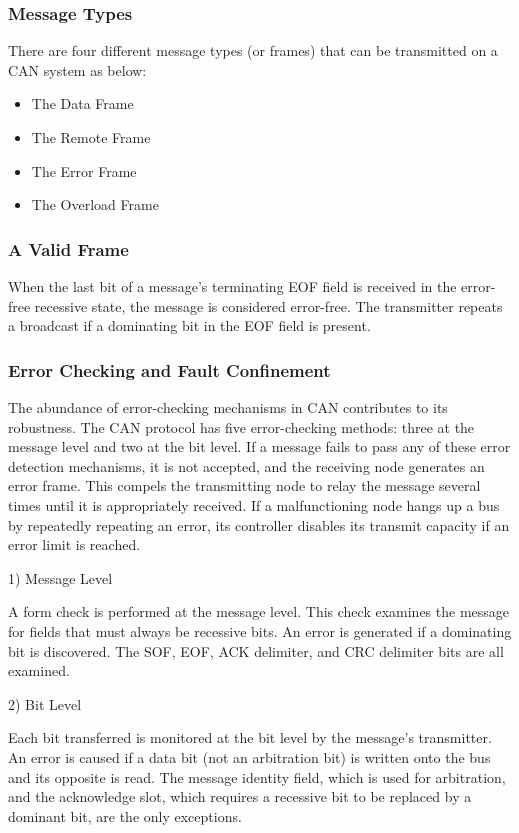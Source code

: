 \subsubsection{Message Types}
There are four different message types (or frames) that can be transmitted on a CAN system as below:

\begin{itemize}
\item The Data Frame
\item The Remote Frame
\item The Error Frame
\item The Overload Frame
\end{itemize}

\subsubsection{A Valid Frame}

When the last bit of a message's terminating EOF field is received in the error-free recessive state, the message is considered error-free. The transmitter repeats a broadcast if a dominating bit in the EOF field is present.

\subsubsection{Error Checking and Fault Confinement}

The abundance of error-checking mechanisms in CAN contributes to its robustness. The CAN protocol has five error-checking methods: three at the message level and two at the bit level. If a message fails to pass any of these error detection mechanisms, it is not accepted, and the receiving node generates an error frame. This compels the transmitting node to relay the message several times until it is appropriately received. If a malfunctioning node hangs up a bus by repeatedly repeating an error, its controller disables its transmit capacity if an error limit is reached.


1) Message Level


A form check is performed at the message level. This check examines the message for fields that must always be recessive bits. An error is generated if a dominating bit is discovered. The SOF, EOF, ACK delimiter, and CRC delimiter bits are all examined.

2) Bit Level


Each bit transferred is monitored at the bit level by the message's transmitter. An error is caused if a data bit (not an arbitration bit) is written onto the bus and its opposite is read. The message identity field, which is used for arbitration, and the acknowledge slot, which requires a recessive bit to be replaced by a dominant bit, are the only exceptions.

